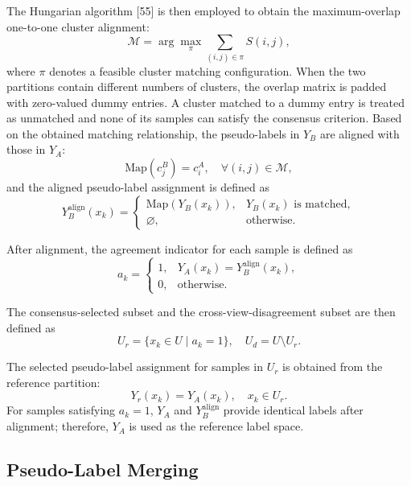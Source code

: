 \documentclass[journal]{IEEEtran}
\begin{document}
The Hungarian algorithm [55] is then employed to obtain the maximum-overlap one-to-one cluster alignment:
\begin{equation}
\mathcal{M}
=
\arg\max_{\pi}
\sum_{(i,j)\in\pi}
S(i,j),
\end{equation}
where $\pi$ denotes a feasible cluster matching configuration.
When the two partitions contain different numbers of clusters, the overlap
matrix is padded with zero-valued dummy entries. A cluster matched to a dummy
entry is treated as unmatched and none of its samples can satisfy the
consensus criterion.
Based on the obtained matching relationship, the pseudo-labels in $Y_B$ are aligned with those in $Y_A$:
\begin{equation}
\mathrm{Map}(c_j^B)=c_i^A,
\quad
\forall(i,j)\in\mathcal{M},
\end{equation}
and the aligned pseudo-label assignment is defined as
\begin{equation}
Y_B^{\mathrm{align}}(x_k)
=
\begin{cases}
\mathrm{Map}(Y_B(x_k)), & Y_B(x_k)\text{ is matched},\\
\varnothing, & \text{otherwise}.
\end{cases}
\end{equation}

After alignment, the agreement indicator for each sample is defined as
\begin{equation}
a_k
=
\begin{cases}
1, & Y_A(x_k)=Y_B^{\mathrm{align}}(x_k),\\
0, & \mathrm{otherwise}.
\end{cases}
\end{equation}

The consensus-selected subset and the cross-view-disagreement subset are then defined as
\begin{equation}
U_r=\{x_k\in U \mid a_k=1\},
\quad
U_d=U\setminus U_r .
\end{equation}


The selected pseudo-label assignment for samples in $U_r$ is obtained from the reference partition:
\begin{equation}
Y_r(x_k)=Y_A(x_k),
\quad x_k\in U_r .
\end{equation}
For samples satisfying $a_k=1$, $Y_A$ and $Y_B^{\mathrm{align}}$ provide identical labels after alignment; therefore, $Y_A$ is used as the reference label space.

\subsection{Pseudo-Label Merging}
\label{sec:plm}
\end{document}
